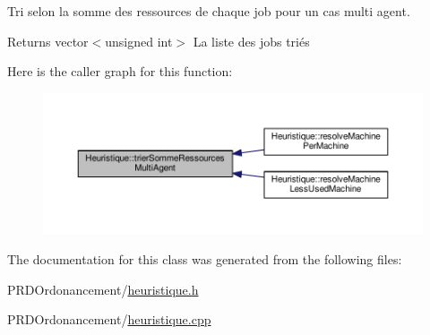 Tri selon la somme des ressources de chaque job pour un cas multi agent. 

\begin{DoxyReturn}{Returns}
vector$<$unsigned int$>$ La liste des jobs triés 
\end{DoxyReturn}
Here is the caller graph for this function\+:
\nopagebreak
\begin{figure}[H]
\begin{center}
\leavevmode
\includegraphics[width=350pt]{classHeuristique_aadc8e02ca8aa127354993bb01910bcef_icgraph}
\end{center}
\end{figure}


The documentation for this class was generated from the following files\+:\begin{DoxyCompactItemize}
\item 
P\+R\+D\+Ordonancement/\hyperlink{heuristique_8h}{heuristique.\+h}\item 
P\+R\+D\+Ordonancement/\hyperlink{heuristique_8cpp}{heuristique.\+cpp}\end{DoxyCompactItemize}
